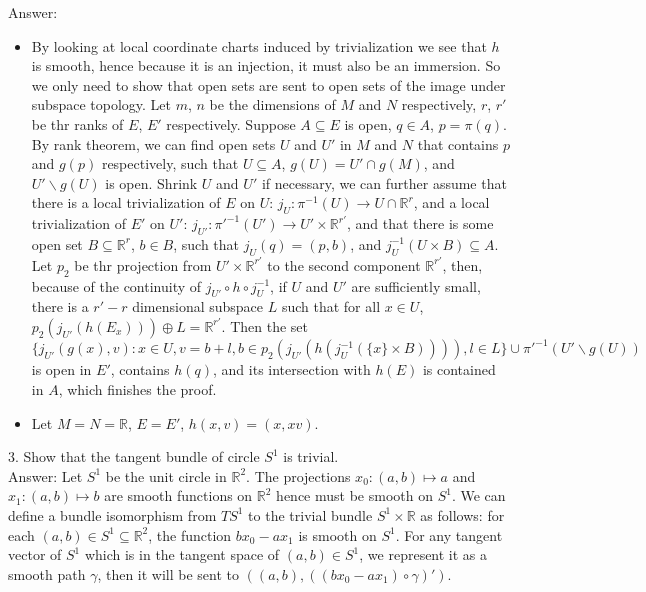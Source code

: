 \documentclass{article}
\theoremstyle{definition}
\begin{document}
Answer:
\begin{itemize}
    \item By looking at local coordinate charts induced by trivialization we see that $h$ is smooth, hence because it is an injection, it must also be an immersion. So we only need to show that open sets are sent to open sets of the image under subspace topology. Let $m$, $n$ be the dimensions of $M$ and $N$ respectively, $r$, $r'$ be thr ranks of $E$, $E'$ respectively. Suppose $A\subseteq E$ is open, $q\in A$, $p=\pi(q)$. By rank theorem, we can find open sets $U$ and $U'$ in $M$ and $N$ that contains $p$ and $g(p)$ respectively, such that $U\subseteq A$, $g(U)=U'\cap g(M)$, and $U'\backslash g(U)$ is open. Shrink $U$ and $U'$ if necessary, we can further assume that there is a local trivialization of $E$ on $U$: $j_U: \pi^{-1}(U)\rightarrow U\cap\mathbb{R}^r$, and a local trivialization of $E'$ on $U'$: $j_{U'}: \pi'^{-1}(U')\rightarrow U'\times\mathbb{R}^{r'}$, and that there is some open set $B\subseteq\mathbb{R}^r$, $b\in B$, such that $j_U(q)=(p, b)$, and $j_U^{-1}(U\times B)\subseteq A$. Let $p_2$ be thr projection from $U'\times\mathbb{R}^{r'}$ to the second component $\mathbb{R}^{r'}$, then, because of the continuity of $j_{U'}\circ h\circ j_U^{-1}$, if $U$ and $U'$ are sufficiently small, there is a $r'-r$ dimensional subspace $L$ such that for all $x\in U$, $p_2(j_{U'}(h(E_{x})))\oplus L=\mathbb{R}^{r'}$. Then the set
    \[\{j_{U'}(g(x), v): x\in U, v=b+l, b\in p_2(j_{U'}(h(j_U^{-1}(\{x\}\times B)))), l\in L\}\cup \pi'^{-1}(U'\backslash g(U))\]
    is open in $E'$, contains $h(q)$, and its intersection with $h(E)$ is contained in $A$, which finishes the proof.
    \item Let $M=N=\mathbb{R}$, $E=E'$, $h(x, v)=(x, xv)$.
\end{itemize}

3. Show that the tangent bundle of circle $S^1$ is trivial.\\

Answer: Let $S^1$ be the unit circle in $\mathbb{R}^2$. The projections $x_0: (a, b)\mapsto a$ and $x_1: (a, b)\mapsto b$ are smooth functions on $\mathbb{R}^2$ hence must be smooth on $S^1$. We can define a bundle isomorphism from $TS^1$ to the trivial bundle $S^1\times\mathbb{R}$ as follows: for each $(a, b)\in S^1\subseteq\mathbb{R}^2$, the function $bx_0-ax_1$ is smooth on $S^1$. For any tangent vector of $S^1$ which is in the tangent space of $(a, b)\in S^1$, we represent it as a smooth path $\gamma$, then it will be sent to $((a, b), ((bx_0-ax_1)\circ\gamma)')$.
\end{document}
